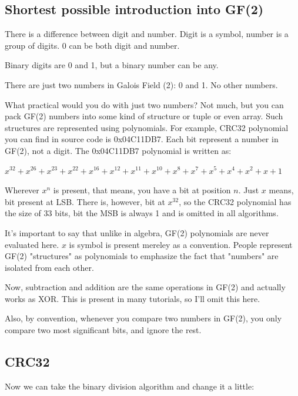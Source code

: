 

\subsection{Shortest possible introduction into GF(2)}

There is a difference between digit and number.
Digit is a symbol, number is a group of digits.
0 can be both digit and number.

Binary digits are 0 and 1, but a binary number can be any.

There are just two numbers in Galois Field (2): 0 and 1.
No other numbers.

What practical would you do with just two numbers?
Not much, but you can pack GF(2) numbers into some kind of structure or tuple or even array.
Such structures are represented using polynomials.
For example, CRC32 polynomial you can find in source code is 0x04C11DB7.
Each bit represent a number in GF(2), not a digit.
The 0x04C11DB7 polynomial is written as: 

$x^{32} + x^{26} + x^{23} + x^{22} + x^{16} + x^{12} + x^{11} + x^{10} + x^8 + x^7 + x^5 + x^4 + x^2 + x + 1$

Wherever $x^n$ is present, that means, you have a bit at position $n$.
Just $x$ means, bit present at LSB.
There is, however, bit at $x^{32}$, so the CRC32 polynomial has the size of 33 bits, bit the MSB is always 1 and is
omitted in all algorithms.

It's important to say that unlike in algebra, GF(2) polynomials are never evaluated here.
$x$ is symbol is present mereley as a convention.
People represent GF(2) "structures" as polynomials to emphasize the fact that "numbers" are isolated from each other.

Now, subtraction and addition are the same operations in GF(2) and actually works as XOR.
This is present in many tutorials, so I'll omit this here.

Also, by convention, whenever you compare two numbers in GF(2), you only compare two most significant bits,
and ignore the rest.

\subsection{CRC32}

Now we can take the binary division algorithm and change it a little:

